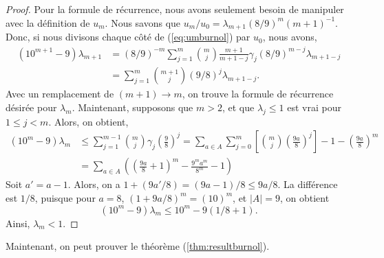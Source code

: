 \begin{proof}
	Pour la formule de récurrence, nous avons seulement besoin de manipuler avec
	la définition de $u_{m}$. Nous savons que $u_{m}/u_{0} = \lambda_{m+1}
	(8/9)^{m} (m+1)^{-1}$. Donc, si nous divisons chaque côté de
	(\ref{eq:umburnol}) par $u_{0}$, nous avons,
	\begin{equation*}
		\begin{split}
			(10^{m+1}-9)\lambda_{m+1} &= (8/9)^{-m}\sum_{j=1}^{m} \binom{m}{j}
			\frac{m+1}{m+1-j} \gamma_{j} (8/9)^{m-j} \lambda_{m+1-j} \\
			&= \sum_{j=1}^{m} \binom{m+1}{j} (9/8)^{j} \lambda_{m+1-j}.
		\end{split}
	\end{equation*}
	Avec un remplacement de $(m+1) \rightarrow m$, on trouve la formule de
	récurrence désirée pour $\lambda_{m}$.
	Maintenant, supposons que $m>2$, et que $\lambda_{j} \le 1$ est vrai pour $1 \le j
	< m$. Alors, on obtient,
	\begin{equation*}
		\begin{split}
			(10^{m}-9)\lambda_{m} &\le \sum_{j=1}^{m-1} \binom{m}{j}\gamma_{j}
			\left( \frac{9}{8} \right)^{j} = \sum_{a\in A} \sum_{j=0}^{m}
			\left[\binom{m}{j}\left(\frac{9a}{8}\right)^{j}\right]-1- \left(
			\frac{9a}{8} \right)^{m} \\
			&= \sum_{a\in A} \left( \left( \frac{9a}{8} + 1 \right)^{m} -
			\frac{9^{m}a^{m}}{8^{m}} - 1 \right) 
		\end{split}
	\end{equation*}
	Soit $a' = a-1$. Alors, on a $1 + (9a'/8) = (9a-1)/8 \le 9a/8$. La
	diff\'erence est $1/8$, puisque pour $a=8$, $(1 + 9a/8)^{m} = (10)^{m}$, et
	$|A| = 9$, on obtient
	\[
		(10^{m} - 9)\lambda_{m} \le 10^{m} - 9(1/8 + 1).
	\]
	Ainsi, $\lambda_{m} < 1$.
\end{proof}
\noindent Maintenant, on peut prouver le th\'eor\`eme (\ref{thm:resultburnol}).
